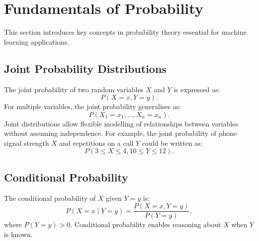 
\section{Fundamentals of Probability}

This section introduces key concepts in probability theory essential for machine learning applications.

\subsection{Joint Probability Distributions}

The joint probability of two random variables $X$ and $Y$ is expressed as:
\[
    P(X = x, Y = y).
\]
For multiple variables, the joint probability generalises as:
\[
    P(X_1 = x_1, \ldots, X_n = x_n).
\]
Joint distributions allow flexible modelling of relationships between variables without assuming independence. For example, the joint probability of phone signal strength $X$ and repetitions on a call $Y$ could be written as:
\[
    P(3 \leq X \leq 4, 10 \leq Y \leq 12).
\]

\subsection{Conditional Probability}

The conditional probability of $X$ given $Y = y$ is:
\[
    P(X = x \mid Y = y) = \frac{P(X = x, Y = y)}{P(Y = y)},
\]
where $P(Y = y) > 0$. Conditional probability enables reasoning about $X$ when $Y$ is known.

